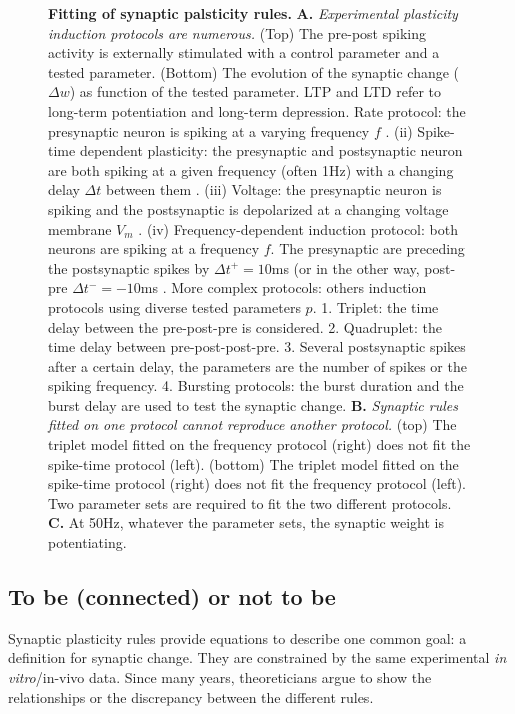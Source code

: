 \begin{figure}[H]
    \caption{\textbf{Fitting of synaptic palsticity rules.} \textbf{A.} \textit{Experimental plasticity induction protocols are numerous.} (Top) The pre-post spiking activity is externally stimulated with a control parameter and a tested parameter. (Bottom) The evolution of the synaptic change ($\Delta w$) as function of the tested parameter. LTP and LTD refer to long-term potentiation and long-term depression. Rate protocol: the presynaptic neuron is spiking at a varying frequency $f$ \citep{dudek_homosynaptic_1992,bliss_long-lasting_1973}. (ii) Spike-time dependent plasticity: the presynaptic and postsynaptic neuron are both spiking at a given frequency (often 1Hz) with a changing delay $\Delta t$ between them \citep{bi_synaptic_1998} . (iii) Voltage: the presynaptic neuron is spiking and the postsynaptic is depolarized at a changing voltage membrane $V_m$ \citep{artola_different_1990, sjostrom_rate_2001}. (iv) Frequency-dependent induction protocol: both neurons are spiking at a frequency $f$. The presynaptic are preceding the postsynaptic spikes by $\Delta t^+=10$ms (or in the other way, post-pre $\Delta t^-=-10$ms \citep{sjostrom_rate_2001}. More complex protocols: others induction protocols using diverse tested parameters $p$. 1. Triplet: the time delay between the pre-post-pre is considered. 2. Quadruplet: the time delay between pre-post-post-pre. 3. Several postsynaptic spikes after a certain delay, the parameters are the number of spikes or the spiking frequency. 4. Bursting protocols: the burst duration and the burst delay are used to test the synaptic change. \textbf{B.} \textit{Synaptic rules fitted on one protocol cannot reproduce another protocol.} (top) The triplet model fitted on the frequency protocol (right) does not fit the spike-time protocol (left).  (bottom) The triplet model fitted on the spike-time protocol (right) does not fit the frequency protocol (left). Two parameter sets are required to fit the two different protocols. \textbf{C.} At 50Hz, whatever the parameter sets, the synaptic weight is potentiating. }
    \label{fig:ProtocolRecap}
\end{figure}


\subsection{To be (connected) or not to be}
Synaptic plasticity rules provide equations to describe one common goal: a definition for synaptic change. They are constrained by the same experimental \textit{in vitro}/in-vivo data. Since many years, theoreticians argue to show the relationships or the discrepancy between the different rules. 
 
